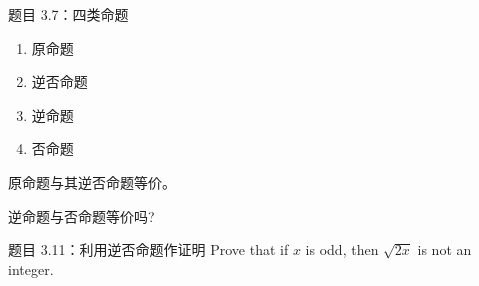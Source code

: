 \begin{frame}{}
  \begin{quote}
    \centerline{}
  \end{quote}
\end{frame}

\begin{frame}{}
  \begin{exampleblock}{题目 3.7：四类命题}
    \begin{enumerate}
      \item 原命题
      \item 逆否命题
      \item 逆命题
      \item 否命题
    \end{enumerate}
  \end{exampleblock}

  \vspace{0.50cm}
  \centerline{原命题与其逆否命题等价。}
  \pause
  \vspace{0.50cm}
  \centerline{逆命题与否命题等价吗?}
\end{frame}

\begin{frame}{}
  \begin{exampleblock}{题目 3.11：利用逆否命题作证明}
    Prove that if $x$ is odd, then $\sqrt{2x}$ is not an integer.
  \end{exampleblock}
\end{frame}
